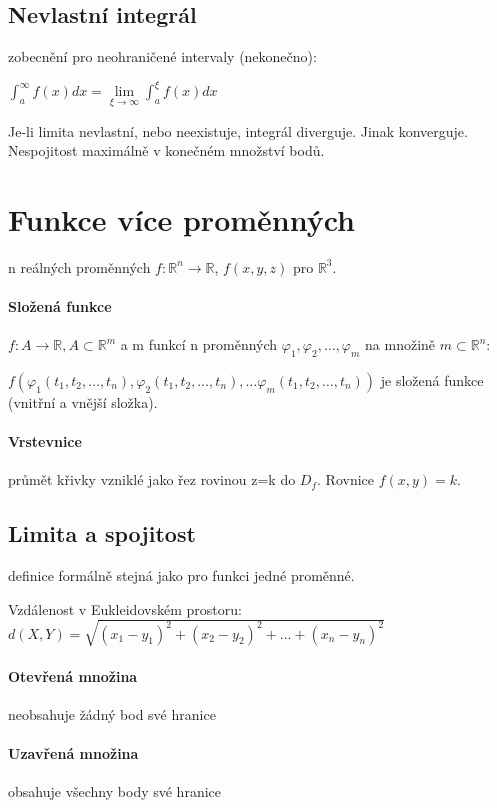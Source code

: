 \documentclass[a4paper, 11pt]{report}
\begin{document}
\subsection{Nevlastní integrál} zobecnění pro neohraničené intervaly (nekonečno):

$\int_a^\infty f(x) dx = \lim\limits_{\xi \to \infty} \int_a^\xi f(x) dx$

Je-li limita nevlastní, nebo neexistuje, integrál diverguje. Jinak konverguje. Nespojitost maximálně v konečném množství bodů.

\section{Funkce více proměnných}
n reálných proměnných $f: \mathbb{R}^n \to \mathbb{R}$, $f(x,y,z)$ pro $\mathbb{R}^3$.

\paragraph{Složená funkce} $f:A \to \mathbb{R}, A \subset \mathbb{R}^m$ a m funkcí n proměnných $\varphi_1, \varphi_2, \dots, \varphi_m$ na množině $m \subset \mathbb{R}^n$:

$f( \varphi_1(t_1, t_2, \dots, t_n),  \varphi_2(t_1, t_2, \dots, t_n), \dots \varphi_m(t_1, t_2, \dots, t_n) )$ je složená funkce (vnitřní a vnější složka).

\paragraph{Vrstevnice} průmět křivky vzniklé jako řez rovinou z=k do $D_f$. Rovnice $f(x,y) = k$.

\subsection{Limita a spojitost}

definice formálně stejná jako pro funkci jedné proměnné.

Vzdálenost v Eukleidovském prostoru: $d(X,Y) = \sqrt{(x_1 - y_1)^2 + (x_2 - y_2)^2 + \dots + (x_n - y_n)^2}$

\paragraph{Otevřená množina} neobsahuje žádný bod své hranice
\paragraph{Uzavřená množina} obsahuje všechny body své hranice
\end{document}
